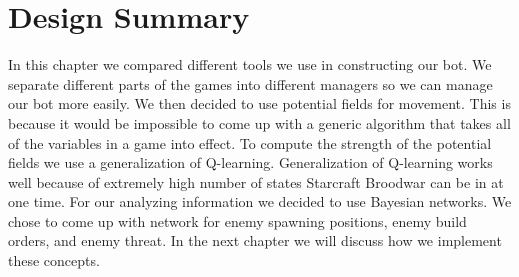 \section{Design Summary}
In this chapter we compared different tools we use in constructing our bot. We separate different parts of the games into different managers so we can manage our bot more easily. We then decided to use potential fields for movement. This is because it would be impossible to come up with a generic algorithm that takes all of the variables in a game into effect. To compute the strength of the potential fields we use a generalization of Q-learning. Generalization of Q-learning works well because of extremely high number of states Starcraft Broodwar can be in at one time. For our analyzing information we decided to use Bayesian networks. We chose to come up with network for enemy spawning positions, enemy build orders, and enemy threat. In the next chapter we will discuss how we implement these concepts. 